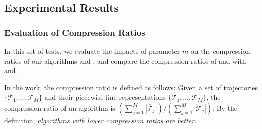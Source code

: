\subsection{Experimental Results}


\subsubsection{Evaluation of Compression Ratios}


In this set of tests, we evaluate the impacts of parameter $m$ on the compression ratios of our algorithms \cist and \cista, and compare the compression ratios of \cist and \cista with \dps and \squishe.

In the work, the compression ratio is defined as follows: Given a set of trajectories $\{\dddot{\mathcal{T}_1}, \ldots, \dddot{\mathcal{T}_M}\}$ and their piecewise line representations $\{\overline{\mathcal{T}_1}, \ldots, \overline{\mathcal{T}_M}\}$, the compression ratio of an algorithm is $(\sum_{j=1}^{M} |\overline{\mathcal{T}}_j |)/(\sum_{j=1}^{M} |\dddot{\mathcal{T}}_j |)$.
By the definition, \emph{algorithms with lower compression ratios are better}.








